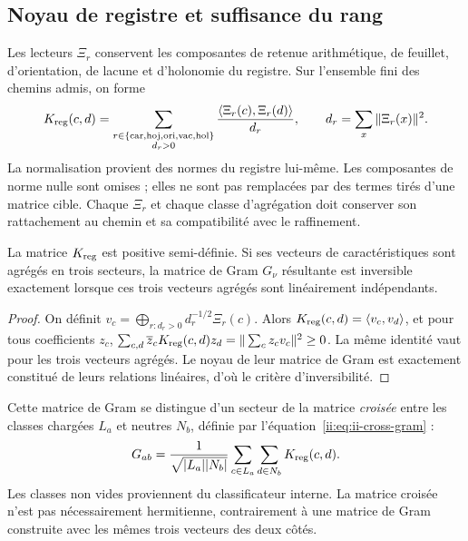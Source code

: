 \subsection{Noyau de registre et suffisance du rang}

Les lecteurs \(\Xi_r\) conservent les composantes de retenue arithmétique, de feuillet,
d'orientation, de lacune et d'holonomie du registre. Sur l'ensemble fini
des chemins admis, on forme
\begin{equation}
 K_{\rm reg}(c,d)=
 \sum_{\substack{r\in\{\mathrm{car},\mathrm{hoj},\mathrm{ori},
                           \mathrm{vac},\mathrm{hol}\}\\ d_r>0}}
 \frac{\langle\Xi_r(c),\Xi_r(d)\rangle}{d_r},
 \qquad
 d_r=\sum_x\|\Xi_r(x)\|^2.
 \label{ii:eq:ii-reg-kernel}
\end{equation}
La normalisation provient des normes du registre lui-même. Les
composantes de norme nulle sont omises ; elles ne sont pas remplacées par des termes tirés
d'une matrice cible. Chaque \(\Xi_r\) et chaque classe d'agrégation doit
conserver son rattachement au chemin et sa compatibilité avec le raffinement.

\begin{proposition}
La matrice \(K_{\rm reg}\) est positive semi-définie. Si ses
vecteurs de caractéristiques sont agrégés en trois secteurs, la matrice de Gram
\(G_\nu\) résultante est inversible exactement lorsque ces trois vecteurs
agrégés sont linéairement indépendants.
\end{proposition}

\begin{proof}
On définit
\(v_c=\bigoplus_{r:d_r>0}d_r^{-1/2}\Xi_r(c)\).
Alors \(K_{\rm reg}(c,d)=\langle v_c,v_d\rangle\), et pour
tous coefficients \(z_c\),
\(\sum_{c,d}\overline z_cK_{\rm reg}(c,d)z_d
=\|\sum_c z_cv_c\|^2\ge0\).
La même identité vaut pour les trois vecteurs agrégés.
Le noyau de leur matrice de Gram est exactement constitué de leurs relations
linéaires, d'où le critère d'inversibilité.
\end{proof}

Cette matrice de Gram se distingue d’un secteur de la matrice \emph{croisée} entre les classes chargées \(L_a\) et neutres \(N_b\), définie par l’équation~\eqref{ii:eq:ii-cross-gram} :
\begin{equation}
 G_{ab}=\frac1{\sqrt{|L_a||N_b|}}
       \sum_{c\in L_a}\sum_{d\in N_b}K_{\rm reg}(c,d).
 \label{ii:eq:ii-cross-gram}
\end{equation}
Les classes non vides proviennent du classificateur interne. La matrice croisée
n'est pas nécessairement hermitienne, contrairement à une matrice de Gram construite avec
les mêmes trois vecteurs des deux côtés.

